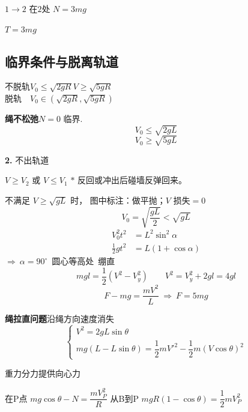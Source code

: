 $1\to2$ 在$2$处 $N=3mg$\par
{}
$T=3mg$

\subsection{临界条件与脱离轨道}
不脱轨\quad $V_0\le\sqrt{2gR}$\quad $V\ge\sqrt{5gR}$ \\
脱轨\ \unclear{$\Rightarrow$}\ $V_0\in\left(\sqrt{2gR},\sqrt{5gR}\right)$

\textbf{绳不松弛}\quad $N=0$ 临界.
\[ V_0\le\sqrt{2gL} \]
\[ V_0\ge\sqrt{5gL} \]

\textbf{2.} 不出轨道

$V\ge V_2$ 或 $V\le V_1$ \qquad $\ast$ 反回或冲出后碰墙反弹回来。

不满足 $V\ge\sqrt{gL}$ 时，
图中标注：做平抛；$V$ 损失$=0$
\[ V_0=\sqrt{\frac{gL}{2}}<\sqrt{gL} \]
\begin{align*}
V_0^2t^2&=L^2\sin^2\alpha\\
\frac{1}{2}gt^2&=L(1+\cos\alpha)
\end{align*}
$\Rightarrow\ \alpha=90^\circ$\ 圆心等高处\ 绷直
\[ mgl=\frac{1}{2}(V^2-V_y^2)\qquad V^2=V_y^2+2gl=4gl \] %
\[ F-mg=\frac{mV^2}{L}\ \Rightarrow\ F=5mg \]

\noindent \textbf{绳拉直问题}\quad 沿绳方向速度消失
\[ \begin{cases} V^2=2gL\sin\theta\\ mg(L-L\sin\theta)=\dfrac12mV'^2-\dfrac12m(V\cos\theta)^2\end{cases} \]


重力分力提供向心力

在P点 $mg\cos\theta-N=\dfrac{mV_P^{2}}{R}$ \qquad 从B到P $mgR(1-\cos\theta)=\dfrac12 mV_P^{2}$

